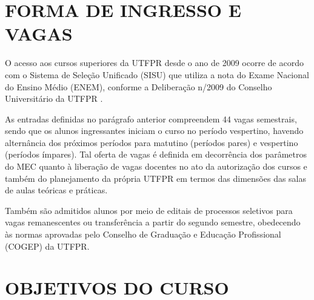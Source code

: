 \section{FORMA DE INGRESSO E VAGAS}

O acesso aos cursos superiores da UTFPR desde o ano de 2009 ocorre de acordo com o Sistema de Seleção Unificado (SISU) que utiliza a nota do Exame Nacional do Ensino Médio (ENEM), conforme a Deliberação n/2009 do Conselho Universitário da UTFPR \cite{sisuutfpr}.


As entradas definidas no parágrafo anterior compreendem 44 vagas semestrais, sendo que os alunos ingressantes iniciam o curso no período vespertino, havendo alternância dos próximos períodos para matutino (períodos pares) e vespertino (períodos ímpares). Tal oferta de vagas é definida em decorrência dos parâmetros do MEC quanto à liberação de vagas docentes no ato da autorização dos cursos e também do planejamento da própria UTFPR em termos das dimensões das salas de aulas teóricas e práticas.

Também são admitidos alunos por meio de editais de processos seletivos para vagas remanescentes ou transferência a partir do segundo semestre, obedecendo às normas aprovadas pelo Conselho de Graduação e Educação Profissional (COGEP) da UTFPR.

\section{OBJETIVOS DO CURSO}
\label{sec:obj}


